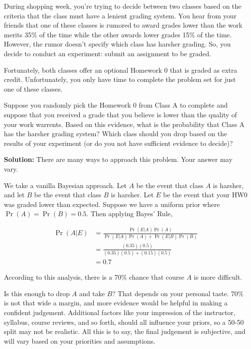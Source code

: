 \documentclass{harvardml}
\theoremstyle{definition}
\theoremstyle{plain}
\begin{document}
\begin{problem}
During shopping week, you're trying to decide between two classes based on the
criteria that the class must have a lenient grading system. You hear from your
friends that one of these classes is rumored to award grades lower than the work
merits 35\% of the time while the other awards lower grades 15\% of the time.
However, the rumor doesn't specify which class has harsher grading. So, you
decide to conduct an experiment: submit an assignment to be graded. 

Fortunately, both classes offer an optional Homework 0 that is graded as extra
credit. Unfortunately, you only have time to complete the problem set for just
one of these classes. 

Suppose you randomly pick the Homework 0 from Class A to complete and suppose
that you received a grade that you believe is lower than the quality of your
work warrents. Based on this evidence, what is the probability that Class A has
the harsher grading system? Which class should you drop based on the results of
your experiment (or do you not have sufficient evidence to decide)?

\textbf{Solution:}
There are many ways to approach this problem. Your answer may vary.

We take a vanilla Bayesian approach. Let $A$ be the event that class $A$ is 
harsher, and let $B$ be the event that class $B$ is harsher. Let $E$ be the event 
that your HW0 was graded lower than expected. Suppose we have a uniform prior
where $\Pr(A) = \Pr(B) = 0.5$. Then applying Bayes' Rule,

\begin{align*}
	\Pr(A | E) &= \frac{\Pr(E | A) \Pr(A)}{\Pr(E | A) \Pr(A) + \Pr(E | B) \Pr(B)} \\
	&= \frac{(0.35) (0.5)}{(0.35) (0.5) + (0.15) (0.5)} \\
	&= 0.7
\end{align*}

According to this analysis, there is a 70\% chance that course $A$ is more
difficult.

Is this enough to drop $A$ and take $B$? That depends on your personal taste.
70\% is not that wide a margin, and more evidence would be helpful in making a
confident judgement. Additional factors like your impression of the instructor,
syllabus, course reviews, and so forth, should all influence your priors, so a
50-50 split may not be realistic. All this is to say, the final judgement is
subjective, and will vary based on your priorities and assumptions.
\end{problem}
\end{document}
